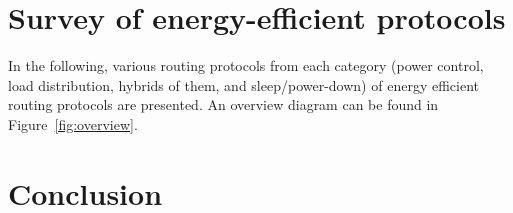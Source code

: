\documentclass[conference]{IEEEtran}
\begin{document}
\section{Survey of energy-efficient protocols}\label{survey}
In the following, various routing protocols from each category (power control,
load distribution, hybrids of them, and sleep/power-down) of energy
efficient routing protocols are presented. An overview diagram can be found
in Figure~\ref{fig:overview}.







\section{Conclusion}\label{conclusion}




\end{document}
